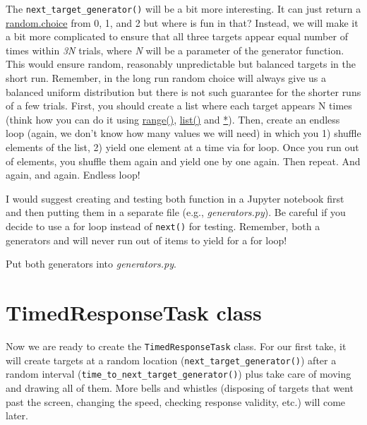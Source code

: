 \documentclass[
]{book}
\begin{document}
The \texttt{next\_target\_generator()} will be a bit more interesting. It can just return a \href{https://docs.python.org/3/library/random.html\#random.choice}{random.choice} from 0, 1, and 2 but where is fun in that? Instead, we will make it a bit more complicated to ensure that all three targets appear equal number of times within \emph{3N} trials, where \emph{N} will be a parameter of the generator function. This would ensure random, reasonably unpredictable but balanced targets in the short run. Remember, in the long run random choice will always give us a balanced uniform distribution but there is not such guarantee for the shorter runs of a few trials. First, you should create a list where each target appears N times (think how you can do it using \href{https://docs.python.org/3/library/functions.html\#func-range}{range()}, \href{https://docs.python.org/3/library/functions.html\#func-list}{list()} and \href{https://docs.python.org/3/library/stdtypes.html\#common-sequence-operations}{*}). Then, create an endless loop (again, we don't know how many values we will need) in which you 1) shuffle elements of the list, 2) yield one element at a time via for loop. Once you run out of elements, you shuffle them again and yield one by one again. Then repeat. And again, and again. Endless loop!

I would suggest creating and testing both function in a Jupyter notebook first and then putting them in a separate file (e.g., \emph{generators.py}). Be careful if you decide to use a for loop instead of \texttt{next()} for testing. Remember, both a generators and will never run out of items to yield for a for loop!

Put both generators into \emph{generators.py}.

\hypertarget{timedresponsetask-class}{%
\section{TimedResponseTask class}\label{timedresponsetask-class}}

Now we are ready to create the \texttt{TimedResponseTask} class. For our first take, it will create targets at a random location (\texttt{next\_target\_generator()}) after a random interval (\texttt{time\_to\_next\_target\_generator()}) plus take care of moving and drawing all of them. More bells and whistles (disposing of targets that went past the screen, changing the speed, checking response validity, etc.) will come later.
\end{document}
